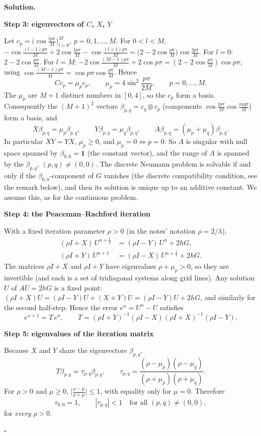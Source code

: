 \documentclass[11pt,a4paper]{article}
\newenvironment{solution}
  {\par\noindent\textbf{Solution.}\par\nobreak}
  {\par\hfill\(\square\)\par}
\newcommand{\step}[1]{\par\addvspace{0.5em}\noindent\textbf{#1}\par\nobreak}
\begin{document}
\begin{solution}
\step{Step 3: eigenvectors of \(C\), \(X\), \(Y\)}
Let \(c_p=\bigl(\cos\frac{lp\pi}M\bigr)_{l=0}^M\),
\(p=0,1,\dots,M\).  For \(0<l<M\),
\(-\cos\frac{(l-1)p\pi}M+2\cos\frac{lp\pi}M-\cos\frac{(l+1)p\pi}M
=\bigl(2-2\cos\frac{p\pi}M\bigr)\cos\frac{lp\pi}M\).  For \(l=0\):
\(2-2\cos\frac{p\pi}M\).  For \(l=M\):
\(-2\cos\frac{(M-1)p\pi}M+2\cos p\pi=(2-2\cos\frac{p\pi}M)\cos p\pi\),
using \(\cos\frac{(M-1)p\pi}M=\cos p\pi\cos\frac{p\pi}M\).  Hence
\[
  Cc_p=\mu_pc_p,\qquad \mu_p=4\sin^2\frac{p\pi}{2M},\qquad p=0,\dots,M .
\]
The \(\mu_p\) are \(M+1\) distinct numbers in \([0,4]\), so the \(c_p\)
form a basis.  Consequently the \((M+1)^2\) vectors
\(\beta_{p,q}=c_q\otimes c_p\) (components
\(\cos\frac{lp\pi}M\cos\frac{mq\pi}M\)) form a basis, and
\[
  X\beta_{p,q}=\mu_p\beta_{p,q},\qquad
  Y\beta_{p,q}=\mu_q\beta_{p,q},\qquad
  A\beta_{p,q}=(\mu_p+\mu_q)\beta_{p,q}.
\]
In particular \(XY=YX\), \(\mu_p\ge0\), and \(\mu_p=0\iff p=0\).  So
\(A\) is singular with null space spanned by
\(\beta_{0,0}=\mathbf 1\) (the constant vector), and the range of \(A\)
is spanned by the \(\beta_{p,q}\), \((p,q)\ne(0,0)\).  The discrete
Neumann problem is solvable if and only if the \(\beta_{0,0}\)-component
of \(G\) vanishes (the discrete compatibility condition, see the remark
below), and then its solution is unique up to an additive constant.
We assume this, as for the continuous problem.

\step{Step 4: the Peaceman--Rachford iteration}
With a fixed iteration parameter \(\rho>0\) (in the notes' notation
\(\rho=2/\lambda\)),
\begin{align*}
  (\rho I+X)\,U^{n+\frac12}&=(\rho I-Y)\,U^n+2hG,\\
  (\rho I+Y)\,U^{n+1}&=(\rho I-X)\,U^{n+\frac12}+2hG .
\end{align*}
The matrices \(\rho I+X\) and \(\rho I+Y\) have eigenvalues
\(\rho+\mu_p>0\), so they are invertible (and each is a set of
tridiagonal systems along grid lines).  Any solution \(U\) of
\(AU=2hG\) is a fixed point: \((\rho I+X)U=(\rho I-Y)U+(X+Y)U=(\rho I-Y)U+2hG\),
and similarly for the second half-step.  Hence the error
\(e^n=U^n-U\) satisfies
\[
  e^{n+1}=T\,e^n,\qquad
  T=(\rho I+Y)^{-1}(\rho I-X)(\rho I+X)^{-1}(\rho I-Y).
\]

\step{Step 5: eigenvalues of the iteration matrix}
Because \(X\) and \(Y\) share the eigenvectors \(\beta_{p,q}\),
\[
  T\beta_{p,q}=\tau_{p,q}\beta_{p,q},\qquad
  \tau_{p,q}=\frac{(\rho-\mu_p)(\rho-\mu_q)}{(\rho+\mu_p)(\rho+\mu_q)} .
\]
For \(\rho>0\) and \(\mu\ge0\), \(\bigl|\frac{\rho-\mu}{\rho+\mu}\bigr|\le1\),
with equality only for \(\mu=0\).  Therefore
\[
  \tau_{0,0}=1,\qquad |\tau_{p,q}|<1\quad\text{for all }(p,q)\ne(0,0),
\]
for \emph{every} \(\rho>0\).


\end{solution}
\end{document}
